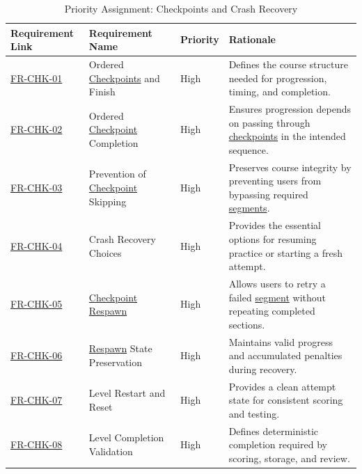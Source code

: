 \documentclass[12pt]{article}
\begin{document}
\begin{table}[htbp]
\centering
\small
\caption{Priority Assignment: Checkpoints and Crash Recovery}
\label{tab:priority-checkpoints}
\begin{tabular}{p{2.1cm} p{2.7cm} p{1.3cm} p{7.0cm}}
\hline
\textbf{Requirement Link} & \textbf{Requirement Name} & \textbf{Priority} & \textbf{Rationale} \\
\hline
\hyperref[sec:s2-checkpoints]{FR-CHK-01} & Ordered \hyperlink{glos:Checkpoint}{Checkpoints} and Finish & High & Defines the course structure needed for progression, timing, and completion. \\
\hyperref[sec:s2-checkpoints]{FR-CHK-02} & Ordered \hyperlink{glos:Checkpoint}{Checkpoint} Completion & High & Ensures progression depends on passing through \hyperlink{glos:Checkpoint}{checkpoints} in the intended sequence. \\
\hyperref[sec:s2-checkpoints]{FR-CHK-03} & Prevention of \hyperlink{glos:Checkpoint}{Checkpoint} Skipping & High & Preserves course integrity by preventing users from bypassing required \hyperlink{glos:Checkpoint}{segments}. \\
\hyperref[sec:s2-checkpoints]{FR-CHK-04} & Crash Recovery Choices & High & Provides the essential options for resuming practice or starting a fresh attempt. \\
\hyperref[sec:s2-checkpoints]{FR-CHK-05} & \hyperlink{glos:Checkpoint}{Checkpoint} \hyperlink{glos:Respawn}{Respawn} & High & Allows users to retry a failed \hyperlink{glos:Checkpoint}{segment} without repeating completed sections. \\
\hyperref[sec:s2-checkpoints]{FR-CHK-06} & \hyperlink{glos:Respawn}{Respawn} State Preservation & High & Maintains valid progress and accumulated penalties during recovery. \\
\hyperref[sec:s2-checkpoints]{FR-CHK-07} & Level Restart and Reset & High & Provides a clean attempt state for consistent scoring and testing. \\
\hyperref[sec:s2-checkpoints]{FR-CHK-08} & Level Completion Validation & High & Defines deterministic completion required by scoring, storage, and review. \\
\hline
\end{tabular}
\end{table}
\end{document}
